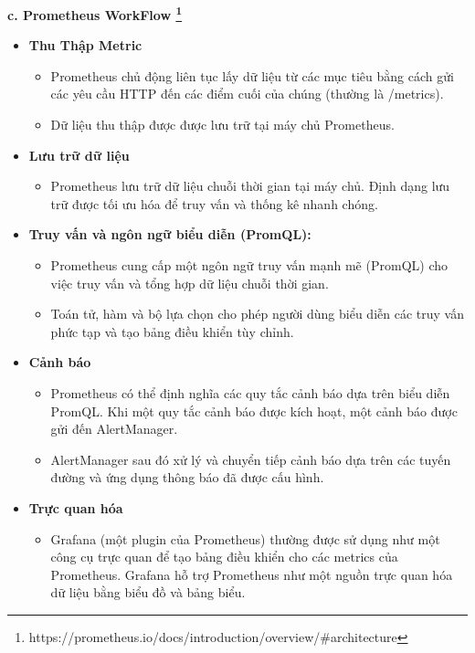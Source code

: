 \textbf{c. Prometheus WorkFlow \footnote{https://prometheus.io/docs/introduction/overview/\#architecture}}
\begin{itemize}
    \item \textbf{Thu Thập Metric}
    \begin{itemize}
        \item Prometheus chủ động liên tục lấy dữ liệu từ các mục tiêu bằng cách gửi các yêu cầu HTTP đến các điểm cuối của chúng (thường là /metrics).
        \item Dữ liệu thu thập được được lưu trữ tại máy chủ Prometheus.
    \end{itemize}
    \item \textbf{Lưu trữ dữ liệu}
    \begin{itemize}
        \item Prometheus lưu trữ dữ liệu chuỗi thời gian tại máy chủ. Định dạng lưu trữ được tối ưu hóa để truy vấn và thống kê nhanh chóng.
    \end{itemize}
    \item \textbf{Truy vấn và ngôn ngữ biểu diễn (PromQL):}
    \begin{itemize}
        \item Prometheus cung cấp một ngôn ngữ truy vấn mạnh mẽ (PromQL) cho việc truy vấn và tổng hợp dữ liệu chuỗi thời gian.
        \item Toán tử, hàm và bộ lựa chọn cho phép người dùng biểu diễn các truy vấn phức tạp và tạo bảng điều khiển tùy chỉnh.
    \end{itemize}
    \item \textbf{Cảnh báo}
    \begin{itemize}
        \item Prometheus có thể định nghĩa các quy tắc cảnh báo dựa trên biểu diễn PromQL. Khi một quy tắc cảnh báo được kích hoạt, một cảnh báo được gửi đến AlertManager.
        \item AlertManager sau đó xử lý và chuyển tiếp cảnh báo dựa trên các tuyến đường và ứng dụng thông báo đã được cấu hình.
    \end{itemize}
    \item \textbf{Trực quan hóa}
    \begin{itemize}
        \item Grafana (một plugin của Prometheus) thường được sử dụng như một công cụ trực quan để tạo bảng điều khiển cho các metrics của Prometheus. Grafana hỗ trợ Prometheus như một nguồn trực quan hóa dữ liệu bằng biểu đồ và bảng biểu.
    \end{itemize}
\end{itemize}
